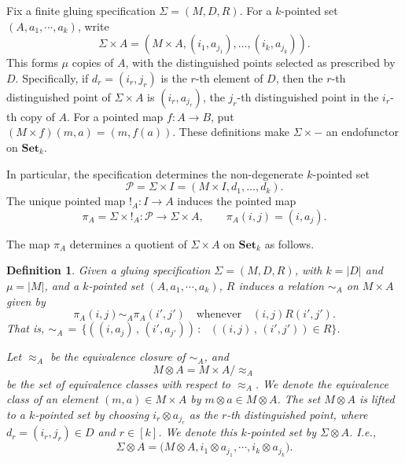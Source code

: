 \documentclass{sn-jnl}%
\theoremstyle{thmstyleone}%
\theoremstyle{thmstyletwo}%
\theoremstyle{thmstylethree}%
\newtheorem{definition}{Definition}%
\newcommand{\set}{\mathbf{Set}_{k}}
\newcommand{\M}{\Sigma}
\newcommand{\F}{\M\otimes}
\newcommand{\A}{\left(A, a_1 ,\cdots , a_k\right)}
\newcommand{\gPoints}{\pi}
\begin{document}
Fix a finite gluing specification $\Sigma=(M,D,R)$. For a $k$-pointed set $\A$, write
\begin{equation} 
\nonumber
    \M\times A=(M\times A,(i_1,a_{j_1}),\ldots,(i_k,a_{j_k})).
\end{equation}
This forms $\mu$ copies of $A$, with the distinguished points selected as prescribed by $D$. Specifically, if $d_r=(i_r, j_r)$ is the $r$-th element of $D$, then the $r$-th distinguished point of $\M \times A$ is $(i_r,a_{j_r})$, the $j_r$-th distinguished point in the ${i_r}$-th copy of $A$. For a pointed map $f:A\to B$, put $(M\times f)(m,a)=(m,f(a))$. These definitions make  $\M\times -$ an endofunctor on $\set$.

In particular, the specification determines the non-degenerate $k$-pointed set
\begin{equation}
\nonumber
    \mathcal P=\M\times I=(M\times I,d_1,\ldots,d_k).
\end{equation}
The unique pointed map $!_A:I\to A$ induces the pointed map
\begin{equation}
\nonumber
    \gPoints_A=\M\times !_A:\mathcal P\longrightarrow\M\times A,
    \qquad \gPoints_A(i,j)=(i,a_j).
\end{equation}

The map $\gPoints_A$ determines a quotient of $\M \times A$ on $\set$ as follows.

\begin{definition}
\label{Def_gluingRel}
    Given a gluing specification $\Sigma=(M,D,R)$, with $k=|D|$ and $\mu=|M|$, and a $k$-pointed set $\left( A, a_1, \cdots, a_k \right)$, $R$ induces a relation $\sim_A$ on $M\times A$ given by 
    \begin{equation} \nonumber
       \gPoints_A(i,j)\sim_A\gPoints_A(i',j')
       \quad\text{whenever}\quad
       (i,j)R(i',j').
    \end{equation}
    That is, $\sim_A\, =\, \{\left(\left(i, a_j \right)\,,\,\left(i', a_{j'} \right)\right)\,:\, \,\,\,\left(\left(i,j\right)\,,\, \left(i', j'\right)\right)\in R \}$.
    
    Let $\approx_A$ be the equivalence closure of $\sim_A$, and 
    \begin{equation} 
    \nonumber
        M \otimes A = M \times A/\approx_A
    \end{equation} 
    be the set of equivalence classes with respect to $\approx_A$.      We denote the equivalence class of an element $(m, a)\in M \times A$ by $m\otimes a \in M \otimes A$. The set $M\otimes A$ is lifted to a $k$-pointed set by choosing $i_r\otimes a_{j_r}$ as the $r$-th distinguished point, where $d_r=(i_r, j_r)\in D$ and $r \in [k]$. We denote this $k$-pointed set by $\F A$. I.e.,
    \begin{equation} 
    \nonumber
        \F A = \Big(M \otimes A, i_1\otimes a_{j_1}, \cdots, i_k\otimes a_{j_k} \Big).
    \end{equation}
\end{definition}
\end{document}
